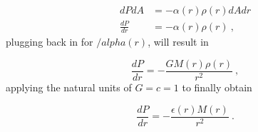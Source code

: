 \documentclass{article}
\begin{document}
\begin{align}
\label{eq:bal}
dPdA&=-{\alpha(r)}\rho(r)dAdr\nonumber \\
\frac{dP}{dr}&=-\alpha(r)\rho(r)~,
\end{align}
plugging back in for $/alpha(r)$, will result in

\begin{equation}
\label{eq:dpdr2}
\dfrac{dP}{dr	}=-\dfrac{GM(r)\rho(r)}{r^{2}}~,
\end{equation}
applying the natural units of $G=c=1$ to finally obtain

\begin{equation}
\label{eq:fdpdr}
\boxed{
\dfrac{dP}{dr}=-\dfrac{\epsilon(r)M(r)}{r^{2}}
}~.
\end{equation}
\end{document}

